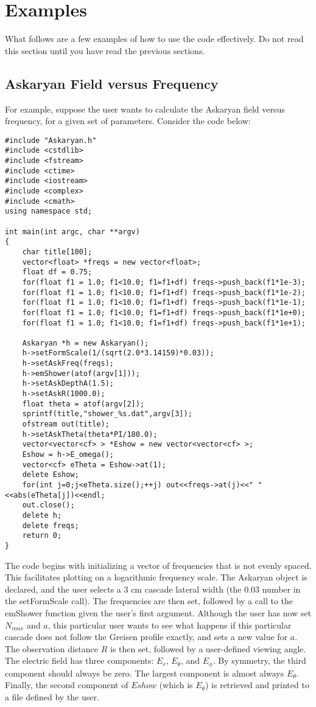 \documentclass[10pt]{article}
\begin{document}
\section{Examples}

What follows are a few examples of how to use the code effectively.  Do not read this section until you have read the previous sections.

\subsection{Askaryan Field versus Frequency}

For example, suppose the user wants to calculate the Askaryan field versus frequency, for a given set of parameters.  Consider the code below:

\begin{verbatim}
#include "Askaryan.h"
#include <cstdlib>
#include <fstream>
#include <ctime>
#include <iostream>
#include <complex>
#include <cmath>
using namespace std;

int main(int argc, char **argv)
{
	char title[100];
	vector<float> *freqs = new vector<float>;
	float df = 0.75;
	for(float f1 = 1.0; f1<10.0; f1=f1+df) freqs->push_back(f1*1e-3);
	for(float f1 = 1.0; f1<10.0; f1=f1+df) freqs->push_back(f1*1e-2);
	for(float f1 = 1.0; f1<10.0; f1=f1+df) freqs->push_back(f1*1e-1);
	for(float f1 = 1.0; f1<10.0; f1=f1+df) freqs->push_back(f1*1e+0);
	for(float f1 = 1.0; f1<10.0; f1=f1+df) freqs->push_back(f1*1e+1);
	
	Askaryan *h = new Askaryan();
	h->setFormScale(1/(sqrt(2.0*3.14159)*0.03));
	h->setAskFreq(freqs);
	h->emShower(atof(argv[1]));
	h->setAskDepthA(1.5);
	h->setAskR(1000.0);
	float theta = atof(argv[2]);
	sprintf(title,"shower_%s.dat",argv[3]);
	ofstream out(title);
	h->setAskTheta(theta*PI/180.0);
	vector<vector<cf> > *Eshow = new vector<vector<cf> >;
	Eshow = h->E_omega();
	vector<cf> eTheta = Eshow->at(1);
	delete Eshow;
	for(int j=0;j<eTheta.size();++j) out<<freqs->at(j)<<" "<<abs(eTheta[j])<<endl;
	out.close();
	delete h;
	delete freqs;
	return 0;
}
\end{verbatim}

The code begins with initializing a vector of frequencies that is not evenly spaced.  This facilitates plotting on a logarithmic frequency scale.  The Askaryan object is declared, and the user selects a 3 cm cascade lateral width (the 0.03 number in the setFormScale call).  The frequencies are then set, followed by a call to the emShower function given the user's first argument.  Although the user has now set $N_{max}$ and $a$, this particular user wants to see what happens if this particular cascade does not follow the Greisen profile exactly, and sets a new value for $a$.  The observation distance $R$ is then set, followed by a user-defined viewing angle.  The electric field has three components: $E_r$, $E_\theta$, and $E_\phi$.  By symmetry, the third component should always be zero.  The largest component is almost always $E_\theta$.  Finally, the second component of $Eshow$ (which is $E_\theta$) is retrieved and printed to a file defined by the user.
\end{document}
